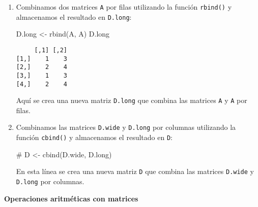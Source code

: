\documentclass[
  a4paper,
]{article}
\newenvironment{Shaded}{}{}
\newcommand{\CommentTok}[1]{\textcolor[rgb]{0.42,0.45,0.49}{#1}}
\newcommand{\FunctionTok}[1]{\textcolor[rgb]{0.44,0.26,0.76}{#1}}
\newcommand{\NormalTok}[1]{\textcolor[rgb]{0.14,0.16,0.18}{#1}}
\newcommand{\OtherTok}[1]{\textcolor[rgb]{0.44,0.26,0.76}{#1}}
\begin{document}
\begin{enumerate}
\begin{Shaded}
\begin{Highlighting}[]
\NormalTok{D.wide }\OtherTok{\textless{}{-}} \FunctionTok{cbind}\NormalTok{(A, A)}
\NormalTok{D.wide}
\end{Highlighting}
\end{Shaded}

\begin{verbatim}
     [,1] [,2] [,3] [,4]
[1,]    1    3    1    3
[2,]    2    4    2    4
\end{verbatim}

  En esta línea se crea una nueva matriz \texttt{D.wide} que combina las
  matrices \texttt{A} y \texttt{A} por columnas.
\item
  Combinamos dos matrices \texttt{A} por filas utilizando la función
  \texttt{rbind()} y almacenamos el resultado en \texttt{D.long}:

\begin{Shaded}
\begin{Highlighting}[]
\NormalTok{D.long }\OtherTok{\textless{}{-}} \FunctionTok{rbind}\NormalTok{(A, A)}
\NormalTok{D.long}
\end{Highlighting}
\end{Shaded}

\begin{verbatim}
     [,1] [,2]
[1,]    1    3
[2,]    2    4
[3,]    1    3
[4,]    2    4
\end{verbatim}

  Aquí se crea una nueva matriz \texttt{D.long} que combina las matrices
  \texttt{A} y \texttt{A} por filas.
\item
  Combinamos las matrices \texttt{D.wide} y \texttt{D.long} por columnas
  utilizando la función \texttt{cbind()} y almacenamos el resultado en
  \texttt{D}:

\begin{Shaded}
\begin{Highlighting}[]
\CommentTok{\# D \textless{}{-} cbind(D.wide, D.long)}
\end{Highlighting}
\end{Shaded}

  En esta línea se crea una nueva matriz \texttt{D} que combina las
  matrices \texttt{D.wide} y \texttt{D.long} por columnas.
\end{enumerate}

\textbf{Operaciones aritméticas con matrices}
\end{document}
